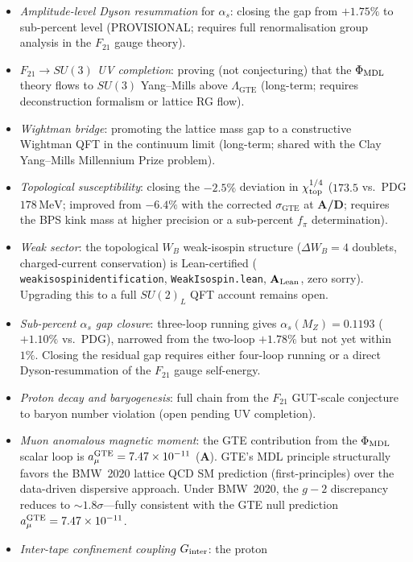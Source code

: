 \documentclass[11pt]{article}
\theoremstyle{remark}
\newcommand{\GTE}{\text{GTE}}
\newcommand{\phimdl}{\Phi_{\rm MDL}}
\newcommand{\Ftwentyone}{F_{21}}
\newcommand{\lean}[1]{%
  \penalty-100
  \begingroup\def\_{\textunderscore\allowbreak}\texttt{#1}\endgroup}
\newcommand{\CatA}{\textbf{A}}
\newcommand{\CatAL}{\ensuremath{\textbf{A}_{\rm Lean}}}
\newcommand{\CatAD}{\textbf{A/D}}
\begin{document}
\begin{itemize}[leftmargin=2em]
\item \textit{Amplitude-level Dyson resummation} for $\alpha_s$: closing the
  gap from $+1.75\%$ to sub-percent level (PROVISIONAL; requires full
  renormalisation group analysis in the $\Ftwentyone$ gauge theory).
\item \textit{$\Ftwentyone \to SU(3)$ UV completion}: proving (not conjecturing)
  that the $\phimdl$ theory flows to $SU(3)$ Yang--Mills above $\Lambda_{\GTE}$
  (long-term; requires deconstruction formalism or lattice RG flow).
\item \textit{Wightman bridge}: promoting the lattice mass gap to a
  constructive Wightman QFT in the continuum limit (long-term; shared with the
  Clay Yang--Mills Millennium Prize problem).
\item \textit{Topological susceptibility}: closing the $-2.5\%$ deviation in
  $\chi_{\rm top}^{1/4}$ ($173.5$ vs.\ PDG $178\,\mathrm{MeV}$; improved from
  $-6.4\%$ with the corrected $\sigma_{\GTE}$ at \CatAD{}; requires the BPS
  kink mass at higher precision or a sub-percent $f_\pi$ determination).
\item \textit{Weak sector}: the topological $W_B$ weak-isospin structure
  ($\Delta W_B = 4$ doublets, charged-current conservation) is Lean-certified
  (\lean{weak\_isospin\_identification}, \texttt{WeakIsospin.lean}, $\CatAL$,
  zero sorry).  Upgrading this to a full $SU(2)_L$ QFT account remains open.
\item \textit{Sub-percent $\alpha_s$ gap closure}: three-loop running gives
  $\alpha_s(M_Z) = 0.1193$ ($+1.10\%$ vs.\ PDG), narrowed from the two-loop
  $+1.78\%$ but not yet within $1\%$.
  Closing the residual gap requires either four-loop running or a direct
  Dyson-resummation of the $\Ftwentyone$ gauge self-energy.
\item \textit{Proton decay and baryogenesis}: full chain from the $\Ftwentyone$
  GUT-scale conjecture to baryon number violation (open pending UV completion).
\item \textit{Muon anomalous magnetic moment}: the GTE contribution from the
  $\phimdl$ scalar loop is $a_\mu^{\rm GTE} = 7.47\times10^{-11}$ ($\CatA$).
  GTE's MDL principle structurally favors the BMW~2020 lattice QCD SM prediction
  (first-principles) over the data-driven dispersive approach.
  Under BMW~2020, the $g-2$ discrepancy reduces to ${\sim}1.8\sigma$---fully
  consistent with the GTE null prediction $a_\mu^{\rm GTE} = 7.47\times10^{-11}$.
\item \textit{Inter-tape confinement coupling $G_{\rm inter}$}: the proton

\end{itemize}
\end{document}

